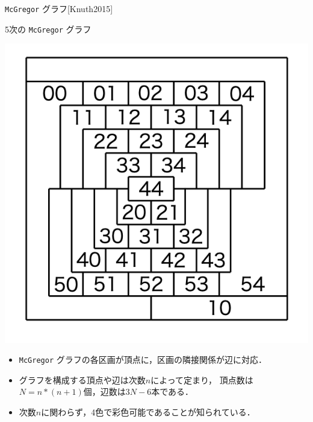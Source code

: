 \documentclass[dvipdfmx,11pt]{beamer}
\newcommand{\code}[1]{\lstinline[basicstyle=\ttfamily]{#1}}
\begin{document}
\begin{frame}{ \code{McGregor} グラフ[Knuth2015]}
 \begin{exampleblock}{5次の \code{McGregor} グラフ}
  \begin{center}
   \includegraphics[scale=0.2]{fig/order5.png}
  \end{center}
 \end{exampleblock}

 \begin{itemize}
  \item \code{McGregor} グラフの各区画が頂点に，区画の隣接関係が辺に対応．
  \item グラフを構成する頂点や辺は次数$n$によって定まり，
	頂点数は$N=n*(n+1)$個，辺数は$3N-6$本である．\cite{Knuth:TAOCP:SAT}
  \item 次数$n$に関わらず，4色で彩色可能であることが知られている．
 \end{itemize}
\end{frame}
\end{document}
